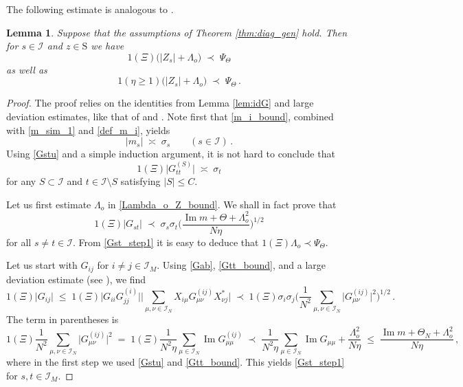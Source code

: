 \documentclass[11pt]{article} %
\numberwithin{equation}{section}
\numberwithin{figure}{section}
\theoremstyle{plain} %
\newtheorem{lemma}[theorem]{Lemma}
\theoremstyle{definition} %
\newcommand{\f}[1]{\boldsymbol{\mathrm{#1}}} %
\renewcommand{\cal}{\mathcal}
\renewcommand{\leq}{\leqslant}
\renewcommand{\geq}{\geqslant}
\newcommand{\ind}[1]{\f 1 (#1)}
\newcommand{\pb}[1]{\bigl({#1}\bigr)}
\newcommand{\pbb}[1]{\biggl({#1}\biggr)}
\newcommand{\pBB}[1]{\Biggl({#1}\Biggr)}
\newcommand{\abs}[1]{\lvert #1 \rvert}
\newcommand{\absb}[1]{\bigl\lvert #1 \bigr\rvert}
\newcommand{\absBB}[1]{\Biggl\lvert #1 \Biggr\rvert}
\DeclareMathOperator{\im}{Im}
\begin{document}
The following estimate is analogous to \cite[Lemma 4.4]{BEKYY}.
\begin{lemma} \label{lem:Lambda_o_Z}
Suppose that the assumptions of Theorem \ref{thm:diag_gen} hold.
Then for $s \in \cal I$ and $z \in \f S$ we have
\begin{equation} \label{Lambda_o_Z_bound}
\ind{\Xi} \pb{\abs{Z_s} + \Lambda_o} \;\prec\; \Psi_\Theta
\end{equation}
as well as
\begin{equation} \label{Lambda_o_Z_bound_initial}
\ind{\eta \geq 1} \pb{\abs{Z_s} + \Lambda_o} \;\prec\; \Psi_\Theta\,.
\end{equation}
\end{lemma}
\begin{proof}
The proof relies on the identities from Lemma \ref{lem:idG} and large deviation estimates, like that of \cite[Lemma 4.4]{BEKYY} and \cite[Theorems 6.8 and 6.9]{PY}. Note first that \eqref{m_i_bound}, combined with \eqref{m_sim_1} and \eqref{def_m_i}, yields
\begin{equation} \label{m_asymp_1}
\abs{m_s} \;\asymp\; \sigma_s \qquad (s \in \cal I)\,.
\end{equation}
Using \eqref{Gstu} and a simple induction argument, it is not hard to conclude that
\begin{equation} \label{Gtt_bound}
\ind{\Xi} \absb{G_{tt}^{(S)}} \;\asymp\; \sigma_t
\end{equation}
for any $S \subset \cal I$ and $t \in \cal I \setminus S$ satisfying $\abs{S} \leq C$.

Let us first estimate $\Lambda_o$ in \eqref{Lambda_o_Z_bound}. We shall in fact prove that
\begin{equation} \label{Gst_step1}
\ind{\Xi} \abs{G_{st}} \;\prec\; \sigma_s \sigma_t \pbb{\frac{\im m + \Theta + \Lambda_o^2}{N \eta}}^{1/2}
\end{equation}
for all $s \neq t \in \cal I$. From \eqref{Gst_step1} it is easy to deduce that $\ind{\Xi} \Lambda_o \prec \Psi_\Theta$.

Let us start with $G_{ij}$ for $i \neq j \in \cal I_M$. Using \eqref{Gab}, \eqref{Gtt_bound}, and a large deviation estimate (see \cite[Lemma 3.1]{BEKYY}), we find
\begin{equation} \label{Gij_estimate}
\ind{\Xi} \abs{G_{ij}} \;\leq\; \ind{\Xi} \absb{G_{ii} G_{jj}^{(i)}} \absBB{\sum_{\mu,\nu \in \cal I_N}  X_{i \mu} G^{(ij)}_{\mu \nu} X^*_{\nu j}} \;\prec\; \ind{\Xi} \sigma_i \sigma_j\pBB{\frac{1}{N^2} \sum_{\mu,\nu \in \cal I_N} \absb{G_{\mu \nu}^{(ij)}}^2}^{1/2}\,.
\end{equation}
The term in parentheses is
\begin{equation*}
\ind{\Xi} \frac{1}{N^2} \sum_{\mu,\nu \in \cal I_N} \absb{G_{\mu \nu}^{(ij)}}^2 \;=\; \ind{\Xi} \frac{1}{N^2 \eta} \sum_{\mu \in \cal I_N} \im G_{\mu \mu}^{(ij)} \;\prec\; \frac{1}{N^2 \eta} \sum_{\mu \in \cal I_N} \im G_{\mu \mu} + \frac{\Lambda_o^2}{N \eta} \;\leq\; \frac{\im m + \Theta_N + \Lambda_o^2}{N \eta}\,,
\end{equation*}
where in the first step we used \eqref{Gstu} and \eqref{Gtt_bound}. This yields \eqref{Gst_step1} for $s,t \in \cal I_M$.


\end{proof}
\end{document}
